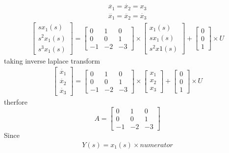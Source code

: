 \begin{enumerate}[label=\thesection.\arabic*.,ref=\thesection.\theenumi]
\begin{align}
\ddot{x_{1}}=\dot{x_{2}}=x_{3}
\end{align}
\begin{align}
\dddot{x_{1}}=\ddot{x_{2}}=\dot{x_{3}}
\end{align}
\begin{gather}
\begin{bmatrix}
sx_{1}(s)\\
s^2x_{1}(s)\\
s^3x_{1}(s)
\end{bmatrix}
=
\begin{bmatrix}
0&1&0\\
0&0&1\\
-1&-2&-3
\end{bmatrix}\times \begin{bmatrix}
x_{1}(s)\\
sx_{1}(s)\\
s^2x{1}(s)
\end{bmatrix}
+
\begin{bmatrix}
0\\
0\\
1
\end{bmatrix} \times U
\end{gather}
taking inverse laplace transform
\begin{gather}
\begin{bmatrix}
\dot{x_{1}}\\
\dot{x_{2}}\\
\dot{x_{3}}
\end{bmatrix}
=
\begin{bmatrix}
0&1&0\\
0&0&1\\
-1&-2&-3
\end{bmatrix}\times \begin{bmatrix}
x_{1}\\
x_{2}\\
x_{3}
\end{bmatrix}
+
\begin{bmatrix}
0\\
0\\
1
\end{bmatrix} \times U
\end{gather}
therfore
\begin{equation}
A=\begin{bmatrix}
0&1&0\\
0&0&1\\
-1&-2&-3
\end{bmatrix}
\end{equation}
\bigskip
Since \begin{align} Y(s)=x_{1}(s)\times numerator \end{align}

\end{enumerate}
